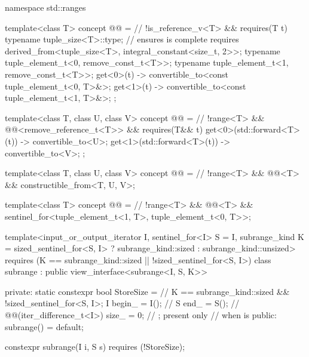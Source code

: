 %
\begin{codeblock}
namespace std::ranges {
  template<class T>
    concept @@ =                                    // \expos
      !is_reference_v<T> && requires(T t) {
        typename tuple_size<T>::type;   // ensures  is complete
        requires derived_from<tuple_size<T>, integral_constant<size_t, 2>>;
        typename tuple_element_t<0, remove_const_t<T>>;
        typename tuple_element_t<1, remove_const_t<T>>;
        { get<0>(t) } -> convertible_to<const tuple_element_t<0, T>&>;
        { get<1>(t) } -> convertible_to<const tuple_element_t<1, T>&>;
      };

  template<class T, class U, class V>
    concept @@ =                     // \expos
      !range<T> && @@<remove_reference_t<T>> &&
      requires(T&& t) {
        { get<0>(std::forward<T>(t)) } -> convertible_to<U>;
        { get<1>(std::forward<T>(t)) } -> convertible_to<V>;
      };

  template<class T, class U, class V>
    concept @@ =                   // \expos
      !range<T> && @@<T> && constructible_from<T, U, V>;

  template<class T>
    concept @@ =                       // \expos
      !range<T> && @@<T> &&
      sentinel_for<tuple_element_t<1, T>, tuple_element_t<0, T>>;

  template<input_or_output_iterator I, sentinel_for<I> S = I, subrange_kind K =
      sized_sentinel_for<S, I> ? subrange_kind::sized : subrange_kind::unsized>
    requires (K == subrange_kind::sized || !sized_sentinel_for<S, I>)
  class subrange : public view_interface<subrange<I, S, K>> {
  private:
    static constexpr bool StoreSize =                           // \expos
      K == subrange_kind::sized && !sized_sentinel_for<S, I>;
    I begin_ = I();                                             // \expos
    S end_ = S();                                               // \expos
    @@(iter_difference_t<I>) size_ = 0;  // \expos; present only
                                                                // when  is 
  public:
    subrange() = default;

    constexpr subrange(I i, S s) requires (!StoreSize);

}}
\end{codeblock}
